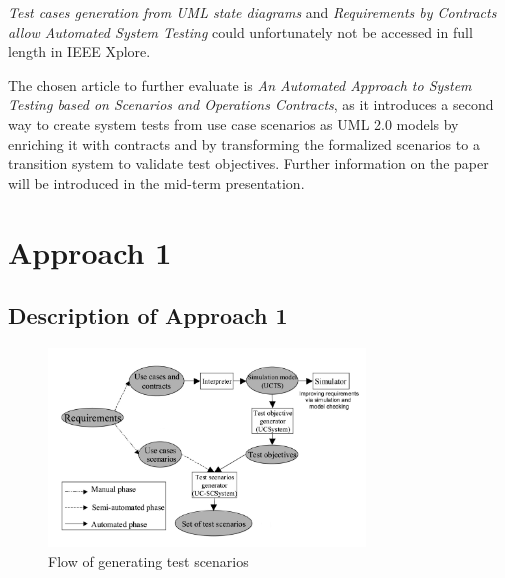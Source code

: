 \textit{Test cases generation from UML state diagrams} and \textit{Requirements by Contracts allow Automated System Testing} could unfortunately not be accessed in full length in IEEE Xplore.

The chosen article to further evaluate is \textit{An Automated Approach to System Testing based on Scenarios and Operations Contracts}, as it introduces a second way to create system tests from use case scenarios as UML 2.0 models by enriching it with contracts and by transforming the formalized scenarios to a transition system to validate test objectives. Further information on the paper will be introduced in the mid-term presentation.

\section{Approach 1} \label{approachone}

\subsection{Description of Approach 1}

\begin{figure}[h]
	\centering
	\includegraphics[width=0.75\textwidth]{./images/transitionsystemflow.png}
	\caption{Flow of generating test scenarios \cite{ClementineNebut2006}}
	\label{tsf}
\end{figure}


